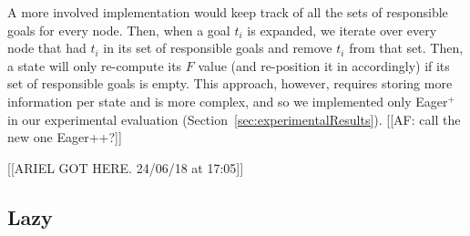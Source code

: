 A more involved implementation would keep track of all the sets of responsible goals for every node.
Then, when a goal $t_i$ is expanded, we iterate over every node that had $t_i$ in its set of responsible goals and remove $t_i$ from that set.
Then, a state will only re-compute its $F$ value (and re-position it in \open accordingly) if its set of responsible goals is empty.
This approach, however, requires storing more information per state and is more complex, and so we implemented only Eager$^+$ in our experimental evaluation (Section~\ref{sec:experimentalResults}). [[AF: call the new one Eager++?]] %




[[ARIEL GOT HERE. 24/06/18 at 17:05]]

\subsection{Lazy \kastar}

